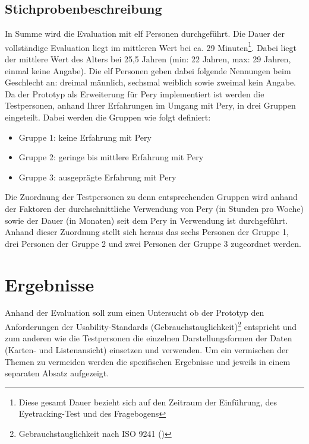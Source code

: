 \documentclass[Bachelorarbeit.tex]{subfiles}
\begin{document}
\subsection{Stichprobenbeschreibung}
\label{Stichproben}
In Summe wird die Evaluation mit elf Personen durchgeführt. 
Die Dauer der vollständige Evaluation liegt im mittleren Wert bei ca. 29 Minuten\footnote{Diese gesamt Dauer bezieht sich auf den Zeitraum der Einführung, des Eyetracking-Test und des Fragebogens}.
Dabei liegt der mittlere Wert des Alters bei 25,5 Jahren (min: 22 Jahren, max: 29 Jahren, einmal keine Angabe). 
Die elf Personen geben dabei folgende Nennungen beim Geschlecht an: dreimal männlich, sechsmal weiblich sowie zweimal kein Angabe.
Da der Prototyp als Erweiterung für Pery implementiert ist werden die Testpersonen, anhand Ihrer Erfahrungen im Umgang mit Pery, in drei Gruppen eingeteilt. 
Dabei werden die Gruppen wie folgt definiert: 
\begin{itemize}		
	\item Gruppe 1: keine Erfahrung mit Pery 
	\item Gruppe 2: geringe bis mittlere Erfahrung mit Pery
	\item Gruppe 3: ausgeprägte Erfahrung mit Pery
\end{itemize}
Die Zuordnung der Testpersonen zu denn entsprechenden Gruppen wird anhand der Faktoren der durchschnittliche Verwendung von Pery (in Stunden pro Woche) sowie der Dauer (in Monaten) seit dem Pery in Verwendung ist durchgeführt.
Anhand dieser Zuordnung stellt sich heraus das sechs Personen der Gruppe 1, drei Personen der Gruppe 2 und zwei Personen der Gruppe 3 zugeordnet werden. 


\section{Ergebnisse}
\label{Ergebnisse}
Anhand der Evaluation soll zum einen Untersucht ob der Prototyp den Anforderungen der Usability-Standards (Gebrauchstauglichkeit)\footnote{Gebrauchstauglichkeit nach ISO 9241 (\cite[siehe:][Abs.: 3.1 Gebrauchstauglichkeit]{Iso9241_11})} entspricht und zum anderen wie die Testpersonen die einzelnen Darstellungsformen der Daten (Karten- und Listenansicht) einsetzen und verwenden. 
Um ein vermischen der Themen zu vermeiden werden die spezifischen Ergebnisse  und  jeweils in einem separaten Absatz aufgezeigt.
\end{document}
